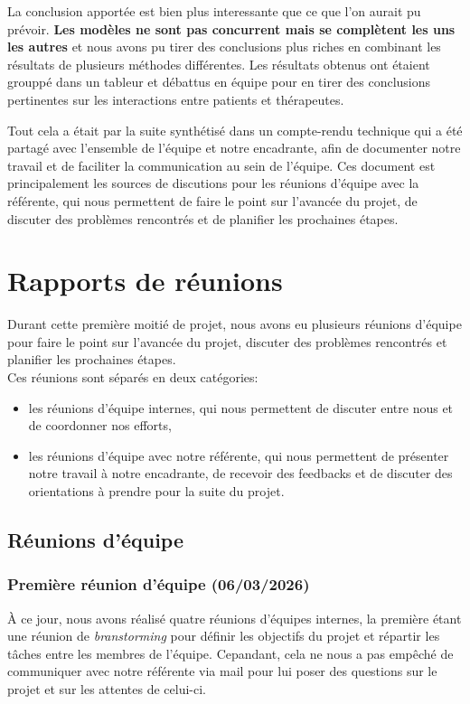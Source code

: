\documentclass[12pt,a4paper]{article}
\begin{document}
La conclusion apportée est bien plus interessante que ce que l'on aurait pu prévoir.
\textbf{Les modèles ne sont pas concurrent mais se complètent les uns les autres} et nous avons pu tirer des conclusions plus riches en combinant les résultats de plusieurs méthodes différentes. 
Les résultats obtenus ont étaient grouppé dans un tableur et débattus en équipe pour en tirer des conclusions pertinentes sur les interactions entre patients et thérapeutes.\smallbreak

Tout cela a était par la suite synthétisé dans un compte-rendu technique qui a été partagé avec l'ensemble de l'équipe et notre encadrante, 
afin de documenter notre travail et de faciliter la communication au sein de l'équipe.
Ces document est principalement les sources de discutions pour les réunions d'équipe avec la référente, 
qui nous permettent de faire le point sur l'avancée du projet, 
de discuter des problèmes rencontrés et de planifier les prochaines étapes.

\pagebreak
\section{Rapports de réunions}
Durant cette première moitié de projet, nous avons eu plusieurs réunions d'équipe pour faire le point sur l'avancée du projet, 
discuter des problèmes rencontrés et planifier les prochaines étapes.\\
Ces réunions sont séparés en deux catégories:
\begin{itemize}
  \item[1.] les réunions d'équipe internes, qui nous permettent de discuter entre nous et de coordonner nos efforts,
  \item[2.] les réunions d'équipe avec notre référente, qui nous permettent de présenter notre travail à notre encadrante, 
  de recevoir des feedbacks et de discuter des orientations à prendre pour la suite du projet.
\end{itemize}

\subsection{Réunions d'équipe}

\subsubsection{Première réunion d'équipe (06/03/2026)}
À ce jour, nous avons réalisé quatre réunions d'équipes internes, la première étant une réunion de \textit{branstorming} 
pour définir les objectifs du projet et répartir les tâches entre les membres de l'équipe. 
Cepandant, cela ne nous a pas empêché de communiquer avec notre référente via mail pour lui poser des questions sur le projet et sur les attentes de celui-ci.
\end{document}

